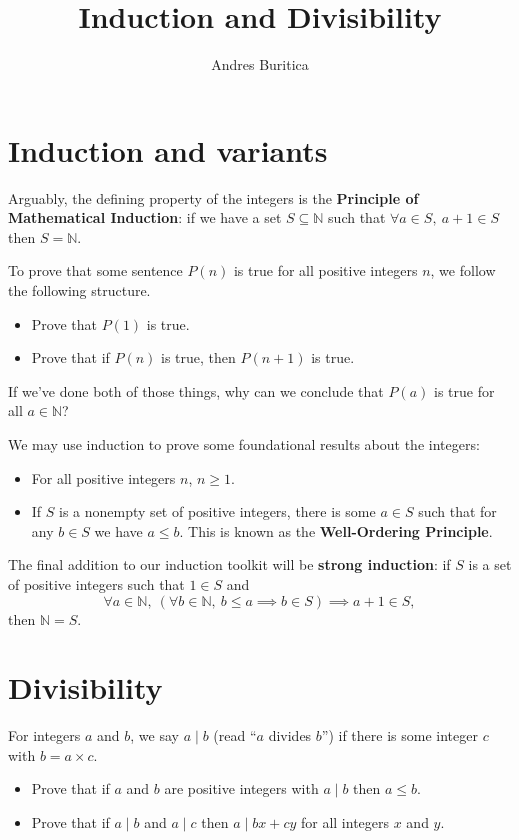 \documentclass{article}
\title{Induction and Divisibility}
\author{Andres Buritica}
\date{}
\begin{document}
\maketitle
\section{Induction and variants}
  Arguably, the defining property of the integers is the \textbf{Principle of
    Mathematical Induction}: if we have a set $S\subseteq\mathbb N$ such that
    $\forall a\in S,\ a+1\in S$ then $S=\mathbb N$.
  
  To prove that some sentence $P(n)$ is true for all positive integers $n$, we
  follow the following structure.
  \begin{itemize}
    \item Prove that $P(1)$ is true.
    \item Prove that if $P(n)$ is true, then $P(n+1)$ is true.
  \end{itemize}
  If we've done both of those things, why can we conclude that $P(a)$ is true
  for all $a\in\mathbb N$?

  We may use induction to prove some foundational results about the integers:
  \begin{itemize}
    \item For all positive integers $n$, $n\ge 1$.
    \item If $S$ is a nonempty set of positive integers, there is some $a\in
      S$ such that for any $b\in S$ we have $a\le b$.
    This is known as the \textbf{Well-Ordering Principle}.
  \end{itemize}

  The final addition to our induction toolkit will be \textbf{strong induction}:
  if $S$ is a set of positive integers such that $1\in S$ and
      \[\forall a\in \mathbb N,\ (\forall b\in\mathbb N,\ b\le a\implies b\in
        S)\implies a+1\in S,\]
        then $\mathbb N=S$.
\section{Divisibility}
  For integers $a$ and $b$, we say $a\mid b$ (read ``$a$ divides
  $b$'') if there is some integer $c$ with $b=a\times c$.
  \begin{itemize}
    \item Prove that if $a$ and $b$ are positive integers with $a\mid b$ then
      $a\le b$.
    \item Prove that if $a\mid b$ and $a\mid c$ then $a\mid bx+cy$ for all
      integers $x$ and $y$.
  \end{itemize}
\end{document}
